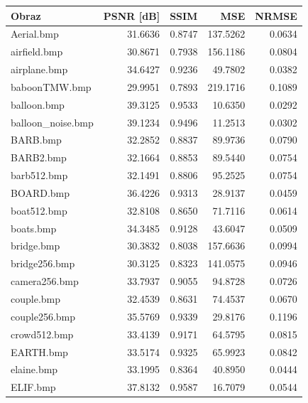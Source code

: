 \documentclass{article}
\begin{document}
\begin{table}[ht]
\centering
\begin{tabular}{@{}lrrrr@{}}
\toprule
Obraz              & PSNR {[}dB{]} & SSIM   & MSE      & NRMSE  \\ \midrule
Aerial.bmp         & 31.6636       & 0.8747 & 137.5262 & 0.0634 \\
airfield.bmp       & 30.8671       & 0.7938 & 156.1186 & 0.0804 \\
airplane.bmp       & 34.6427       & 0.9236 & 49.7802  & 0.0382 \\
baboonTMW.bmp      & 29.9951       & 0.7893 & 219.1716 & 0.1089 \\
balloon.bmp        & 39.3125       & 0.9533 & 10.6350  & 0.0292 \\
balloon\_noise.bmp & 39.1234       & 0.9496 & 11.2513  & 0.0302 \\
BARB.bmp           & 32.2852       & 0.8837 & 89.9736  & 0.0790 \\
BARB2.bmp          & 32.1664       & 0.8853 & 89.5440  & 0.0754 \\
barb512.bmp        & 32.1491       & 0.8806 & 95.2525  & 0.0754 \\
BOARD.bmp          & 36.4226       & 0.9313 & 28.9137  & 0.0459 \\
boat512.bmp        & 32.8108       & 0.8650 & 71.7116  & 0.0614 \\
boats.bmp          & 34.3485       & 0.9128 & 43.6047  & 0.0509 \\
bridge.bmp         & 30.3832       & 0.8038 & 157.6636 & 0.0994 \\
bridge256.bmp      & 30.3125       & 0.8323 & 141.0575 & 0.0946 \\
camera256.bmp      & 33.7937       & 0.9055 & 94.8728  & 0.0726 \\
couple.bmp         & 32.4539       & 0.8631 & 74.4537  & 0.0670 \\
couple256.bmp      & 35.5769       & 0.9339 & 29.8176  & 0.1196 \\
crowd512.bmp       & 33.4139       & 0.9171 & 64.5795  & 0.0815 \\
EARTH.bmp          & 33.5174       & 0.9325 & 65.9923  & 0.0842 \\
elaine.bmp         & 33.1995       & 0.8364 & 40.8950  & 0.0444 \\
ELIF.bmp           & 37.8132       & 0.9587 & 16.7079  & 0.0544 \\

\end{tabular}
\end{table}
\end{document}

